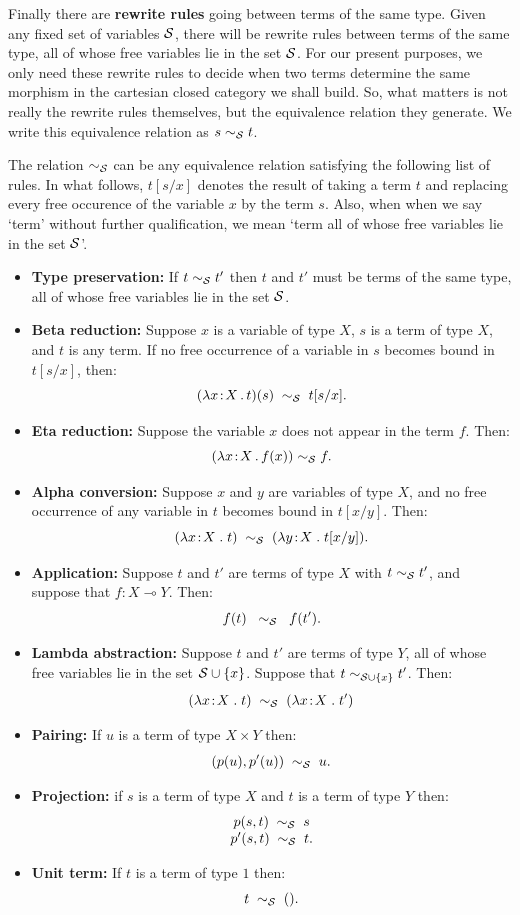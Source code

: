 \documentclass[12pt,twoside,openright]{report}
\newcommand{\lhom}{\multimap}
\begin{document}
Finally there are {\bf rewrite rules} going between terms of the same type.  Given any fixed set of variables ${\cal S}$, there will be rewrite rules between terms of the same type, all of whose free variables lie in the set ${\cal S}$.  For our present purposes, we only need these rewrite rules to decide when two terms determine the same morphism in the cartesian closed category we shall build.  So, what matters is not really the rewrite rules themselves, but the equivalence relation they generate.  We write this equivalence relation as $s {\; {\sim}_{\cal S} \; } t$.

The relation $\sim_{\cal S}$ can be any equivalence relation satisfying the following list of rules.  In what follows, $t[s/x]$
denotes the result of taking a term $t$ and replacing every free occurence of the variable $x$ by the term $s$.  Also, when when we say
`term' without further qualification, we mean `term all of whose free variables lie in the set ${\cal S}$'.
\begin{itemize}
\item {\bf Type preservation:} If $t \sim_{\cal S} t'$ then 
$t$ and $t'$ must be terms of the same type, all of whose free variables lie in the set $\cal S$.
\item {\bf Beta reduction:} Suppose $x$ is a variable of type $X$, $s$ is a term of type $X$, and $t$ is any term. If no free occurrence of a variable in $s$ becomes bound in $t[s/x]$, then:
\[    (\lambda x\!:\!X\,.\, t)(s) { \;\; {\sim}_{\cal S} \;\; } t[s/x] .\]
\item {\bf Eta reduction:} Suppose the variable $x$ does not appear in the term $f$.  Then:
\[        (\lambda x\! : \! X \, .\, f(x)) {\; {\sim}_{\cal S} \; } f . \]
\item {\bf Alpha conversion:}  Suppose $x$ and $y$ are variables of type $X$, and no free occurrence of any variable in $t$ becomes bound in $t[x/y]$.  Then:
\[        (\lambda x\! : \! X \; . \; t) \;\; {\sim}_{\cal S} \;\;
(\lambda y\!:\!X \; . \; t[x/y]). \]
\item {\bf Application:} 
Suppose $t$ and $t'$ are terms of type $X$ with $t \sim_{\cal S} t'$, and suppose that $f\! :\! X \lhom Y$.  Then:
\[       f(t) \;\; \sim_{\cal S} \;\;  f(t').  \]
\item {\bf Lambda abstraction:}
Suppose $t$ and $t'$ are terms of type $Y$, all of whose free variables lie in the set ${\cal S} \cup \{x\}$.  Suppose that $t \sim_{{\cal S} \cup \{ x \}} t'$.  Then:
\[        (\lambda x\! : \! X \; . \; t) \;\; {\sim}_{\cal S} \;\;
(\lambda x\!:\!X \; . \; t') \]
\item {\bf Pairing:} If $u$ is a term of type $X \times Y$ then:
\[  (p(u),p'(u)) \;\; {\sim}_{\cal S} \;\; u .\]
\item {\bf Projection:} if  $s$ is a term of type $X$ and $t$
is a term of type $Y$ then:
\[
\begin{array}{c}
p(s,t) \;\; {\sim}_{\cal S} \;\;  s  \\
p'(s,t) \;\; {\sim}_{\cal S} \;\;  t.
\end{array}
\]
\item {\bf Unit term:} If $t$ is a term of type $1$ then:
\[          t \;\; {\sim}_{\cal S} \;\;  ().  \]
\end{itemize}
\end{document}
